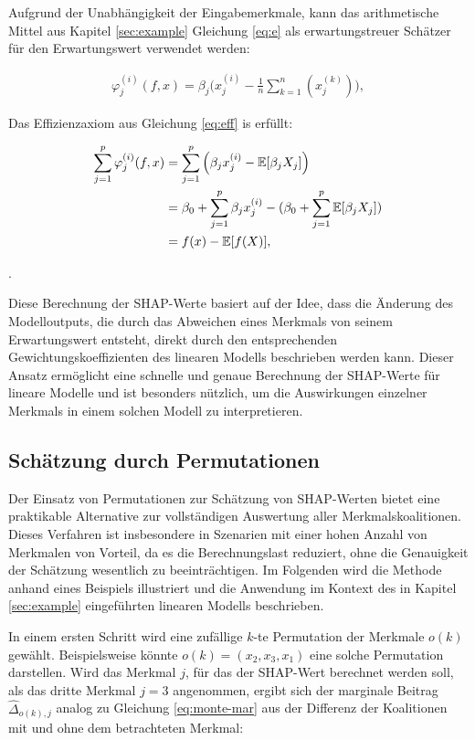 Aufgrund der Unabhängigkeit der Eingabemerkmale, kann das arithmetische Mittel aus Kapitel 
\ref{sec:example} Gleichung \ref{eq:e} als erwartungstreuer Schätzer für den Erwartungswert verwendet werden:

\begin{align}
    \varphi_j^{(i)}(f, x) = \beta_j \Big(x_j^{(i)} - \frac{1}{n} \sum_{k=1}^{n} (x_j^{(k)})\Big),
\end{align}

Das Effizienzaxiom aus Gleichung \ref{eq:eff} is erfüllt:

\begin{align}
    \sum_{j=1}^p \varphi_j^{(i)}(f, x) &= \sum_{j=1}^p  \Big( \beta_j x_j^{(i)} - \mathbb{E}[\beta_j X_j]\Big) \\ \notag
                                    &= \beta_0 + \sum_{j=1}^p \beta_j x_j^{(i)} - ( \beta_0 + \sum_{j=1}^p \mathbb{E}[\beta_j X_j]) \\ \notag
                                    &= f(x) - \mathbb{E}[f(X)],
\end{align}                 

\cite[S. 48]{Molnar_2023}.

Diese Berechnung der SHAP-Werte basiert auf der Idee, dass die Änderung 
des Modelloutputs, die durch das Abweichen eines Merkmals von seinem 
Erwartungswert entsteht, direkt durch den entsprechenden Gewichtungskoeffizienten 
des linearen Modells beschrieben werden kann. Dieser Ansatz ermöglicht eine 
schnelle und genaue Berechnung der SHAP-Werte für lineare Modelle und ist 
besonders nützlich, um die Auswirkungen einzelner Merkmals in einem solchen 
Modell zu interpretieren. 

\subsection{Schätzung durch Permutationen}
\label{subsec:permutation}

Der Einsatz von Permutationen zur Schätzung von SHAP-Werten bietet eine 
praktikable Alternative zur vollständigen Auswertung aller Merkmalskoalitionen. 
Dieses Verfahren ist insbesondere in Szenarien mit einer hohen Anzahl von Merkmalen von Vorteil, 
da es die Berechnungslast reduziert, ohne die Genauigkeit der Schätzung wesentlich zu beeinträchtigen. 
Im Folgenden wird die Methode anhand eines Beispiels illustriert und die Anwendung im Kontext des in 
Kapitel \ref{sec:example} eingeführten linearen Modells beschrieben.

In einem ersten Schritt wird eine zufällige $k$-te Permutation der Merkmale $o(k)$ gewählt.
Beispielsweise könnte $o(k) = (x_2, x_3, x_1)$ eine solche Permutation darstellen.
Wird das Merkmal $j$, für das der SHAP-Wert berechnet werden soll, als das dritte Merkmal $j=3$ angenommen, 
ergibt sich der marginale Beitrag $\hat{\Delta}_{o(k), j}$ analog zu Gleichung \ref{eq:monte-mar} 
aus der Differenz der Koalitionen mit und ohne dem betrachteten Merkmal:

